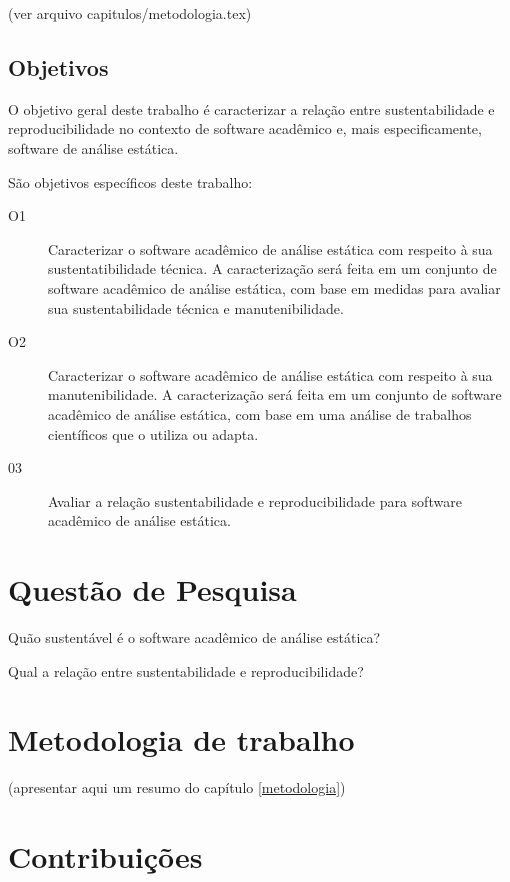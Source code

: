 (ver arquivo capitulos/metodologia.tex)

\subsection{Objetivos}

O objetivo geral deste trabalho é caracterizar a relação entre sustentabilidade
e reproducibilidade no contexto de software acadêmico e, mais especificamente,
software de análise estática. 

São objetivos específicos deste trabalho:

\begin{description}
  \item[O1] Caracterizar o software acadêmico de análise estática com respeito à sua sustentatibilidade técnica.
A caracterização será feita em um conjunto de software acadêmico de análise estática, com base em medidas para avaliar
sua sustentabilidade técnica e manutenibilidade.
  \item[O2] Caracterizar o software acadêmico de análise estática com respeito à sua manutenibilidade.
A caracterização será feita em um conjunto de software acadêmico de análise estática, com base em uma análise de trabalhos científicos que o utiliza ou adapta.
  \item[03] Avaliar a relação sustentabilidade e reproducibilidade para software acadêmico de análise estática.
\end{description}

\section{Questão de Pesquisa}

Quão sustentável é o software acadêmico de análise estática?

Qual a relação entre sustentabilidade e reproducibilidade?

\section{Metodologia de trabalho}

(apresentar aqui um resumo do capítulo \ref{metodologia})


\section{Contribuições}

